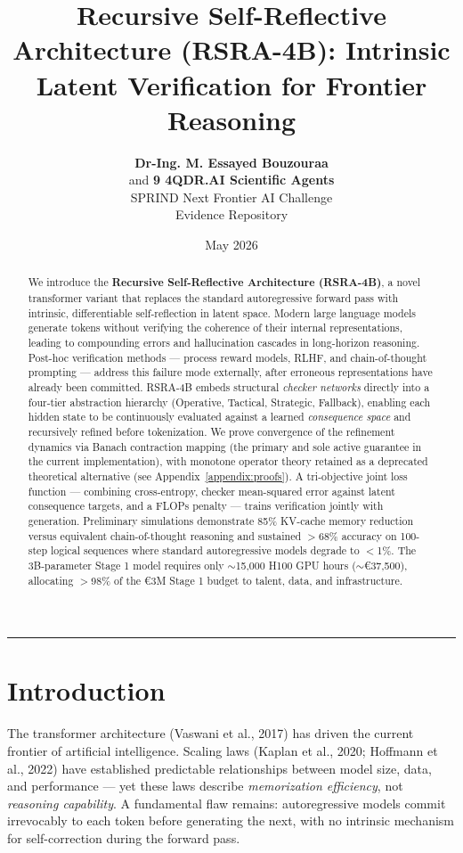 \documentclass[11pt,a4paper]{article}
\title{\textbf{Recursive Self-Reflective Architecture (RSRA-4B): Intrinsic Latent Verification for Frontier Reasoning}}
\author{\textbf{Dr-Ing. M. Essayed Bouzouraa} \\
and \textbf{9 4QDR.AI Scientific Agents} \\
\vspace{1em}
SPRIND Next Frontier AI Challenge \\
Evidence Repository}
\date{May 2026}
\theoremstyle{definition}
\begin{document}
\maketitle

\begin{abstract}
We introduce the \textbf{Recursive Self-Reflective Architecture (RSRA-4B)}, a novel transformer variant that replaces the standard autoregressive forward pass with intrinsic, differentiable self-reflection in latent space. Modern large language models generate tokens without verifying the coherence of their internal representations, leading to compounding errors and hallucination cascades in long-horizon reasoning. Post-hoc verification methods --- process reward models, RLHF, and chain-of-thought prompting --- address this failure mode externally, after erroneous representations have already been committed. RSRA-4B embeds structural \textit{checker networks} directly into a four-tier abstraction hierarchy (Operative, Tactical, Strategic, Fallback), enabling each hidden state to be continuously evaluated against a learned \textit{consequence space} and recursively refined before tokenization. We prove convergence of the refinement dynamics via Banach contraction mapping (the primary and sole active guarantee in the current implementation), with monotone operator theory retained as a deprecated theoretical alternative (see Appendix~\ref{appendix:proofs}). A tri-objective joint loss function --- combining cross-entropy, checker mean-squared error against latent consequence targets, and a FLOPs penalty --- trains verification jointly with generation. Preliminary simulations demonstrate 85\% KV-cache memory reduction versus equivalent chain-of-thought reasoning and sustained $>$68\% accuracy on 100-step logical sequences where standard autoregressive models degrade to $<$1\%. The 3B-parameter Stage 1 model requires only $\sim$15,000 H100 GPU hours ($\sim$€37,500), allocating $>$98\% of the €3M Stage 1 budget to talent, data, and infrastructure.
\end{abstract}

\hrule
\vspace{1em}

\section{Introduction}

The transformer architecture (Vaswani et al., 2017) has driven the current frontier of artificial intelligence. Scaling laws (Kaplan et al., 2020; Hoffmann et al., 2022) have established predictable relationships between model size, data, and performance --- yet these laws describe \textit{memorization efficiency}, not \textit{reasoning capability}. A fundamental flaw remains: autoregressive models commit irrevocably to each token before generating the next, with no intrinsic mechanism for self-correction during the forward pass.
\end{document}
